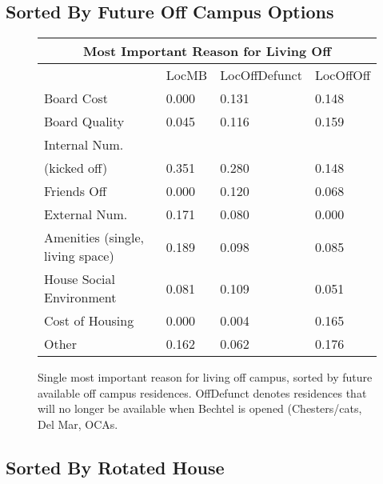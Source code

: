 \documentclass[12pt]{article} %
\begin{document}
\subsection{Sorted By Future Off Campus Options}
\vspace{-5mm}
\begin{figure}[H]
\begin{center}
\begin{tabular}{|m{4 cm}|m{2.6 cm}|m{2.6 cm}|m{2.6 cm} |}
\hline
\multicolumn{4}{|c|}{Most Important Reason for Living Off}\\ \hline
& LocMB& LocOffDefunct& LocOffOff\\ \hline
Board Cost   &  0.000 &  0.131 &  0.148\\ \hline
Board Quality   &  0.045 &  0.116 &  0.159\\ \hline
Internal Num.\\ (kicked off)   &  0.351 &  0.280 &  0.148\\ \hline
Friends Off   &  0.000 &  0.120 &  0.068\\ \hline
External Num.   &  0.171 &  0.080 &  0.000\\ \hline
Amenities
(single, living space)   &  0.189 &  0.098 &  0.085\\ \hline
House Social
Environment   &  0.081 &  0.109 &  0.051\\ \hline
Cost of Housing   &  0.000 &  0.004 &  0.165\\ \hline
Other   &  0.162 &  0.062 &  0.176\\ \hline
\end{tabular}
\end{center}
	\caption{Single most important reason for living off campus, sorted by future available off campus residences. OffDefunct denotes residences that will no longer be available when Bechtel is opened (Chesters/cats, Del Mar, OCAs.}

	
\end{figure}

\subsection{Sorted By Rotated House}
\end{document}
